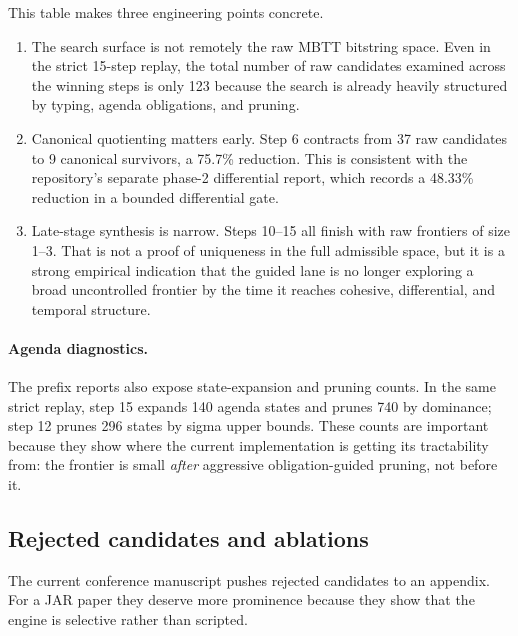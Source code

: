 \documentclass[11pt,a4paper]{article}
\begin{document}
This table makes three engineering points concrete.
\begin{enumerate}[nosep]
  \item The search surface is not remotely the raw MBTT bitstring space. Even in the strict 15-step replay, the total number of raw candidates examined across the winning steps is only 123 because the search is already heavily structured by typing, agenda obligations, and pruning.
  \item Canonical quotienting matters early. Step 6 contracts from 37 raw candidates to 9 canonical survivors, a 75.7\% reduction. This is consistent with the repository's separate phase-2 differential report, which records a 48.33\% reduction in a bounded differential gate.
  \item Late-stage synthesis is narrow. Steps 10--15 all finish with raw frontiers of size 1--3. That is not a proof of uniqueness in the full admissible space, but it is a strong empirical indication that the guided lane is no longer exploring a broad uncontrolled frontier by the time it reaches cohesive, differential, and temporal structure.
\end{enumerate}

\paragraph{Agenda diagnostics.}
The prefix reports also expose state-expansion and pruning counts. In the same strict replay, step 15 expands 140 agenda states and prunes 740 by dominance; step 12 prunes 296 states by sigma upper bounds. These counts are important because they show where the current implementation is getting its tractability from: the frontier is small \emph{after} aggressive obligation-guided pruning, not before it.

\subsection{Rejected candidates and ablations}

The current conference manuscript pushes rejected candidates to an appendix. For a JAR paper they deserve more prominence because they show that the engine is selective rather than scripted.
\end{document}
